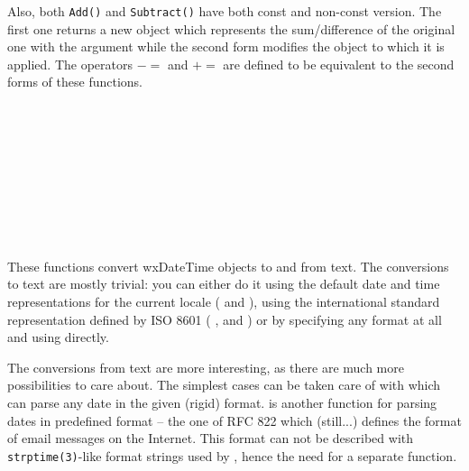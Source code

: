 Also, both {\tt Add()} and {\tt Subtract()} have both const and non-const
version. The first one returns a new object which represents the
sum/difference of the original one with the argument while the second form
modifies the object to which it is applied. The operators $-=$ and $+=$ are
defined to be equivalent to the second forms of these functions.

\\
\\
\\
\\
\\
\\
\\
\\


\label{datetimeparsing}

These functions convert wxDateTime objects to and from text. The
conversions to text are mostly trivial: you can either do it using the default
date and time representations for the current locale (
 and
), using the international standard
representation defined by ISO 8601 (
,
 and
) or by specifying any
format at all and using  directly.

The conversions from text are more interesting, as there are much more
possibilities to care about. The simplest cases can be taken care of with
 which can parse any date in the
given (rigid) format.  is
another function for parsing dates in predefined format -- the one of RFC 822
which (still...) defines the format of email messages on the Internet. This
format can not be described with {\tt strptime(3)}-like format strings used by
, hence the need for a separate function.

